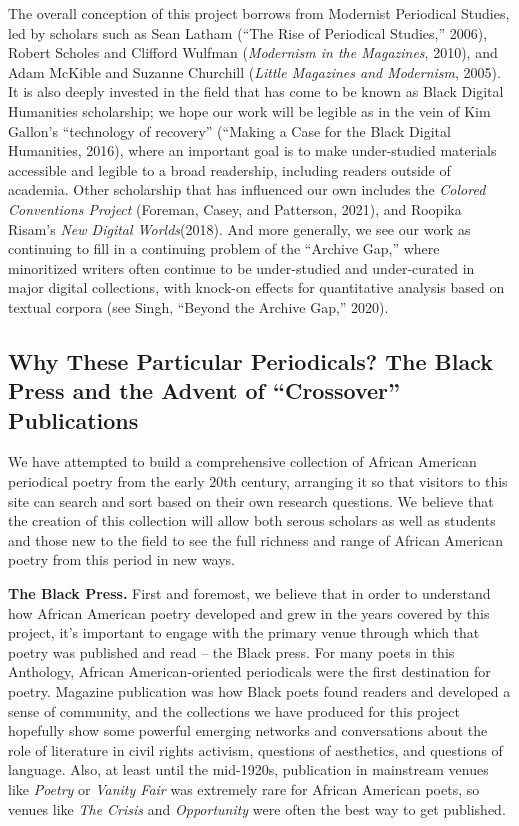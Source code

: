 \documentclass[
  letterpaper,
  DIV=11,
  numbers=noendperiod]{scrartcl}
\begin{document}
The overall conception of this project borrows from Modernist Periodical
Studies, led by scholars such as Sean Latham (``The Rise of Periodical
Studies,'' 2006), Robert Scholes and Clifford Wulfman (\emph{Modernism
in the Magazines}, 2010), and Adam McKible and Suzanne Churchill
(\emph{Little Magazines and Modernism}, 2005). It is also deeply
invested in the field that has come to be known as Black Digital
Humanities scholarship; we hope our work will be legible as in the vein
of Kim Gallon's ``technology of recovery'' (``Making a Case for the
Black Digital Humanities, 2016), where an important goal is to make
under-studied materials accessible and legible to a broad readership,
including readers outside of academia. Other scholarship that has
influenced our own includes the \emph{Colored Conventions Project}
(Foreman, Casey, and Patterson, 2021), and Roopika Risam's \emph{New
Digital Worlds}(2018). And more generally, we see our work as continuing
to fill in a continuing problem of the ``Archive Gap,'' where
minoritized writers often continue to be under-studied and under-curated
in major digital collections, with knock-on effects for quantitative
analysis based on textual corpora (see Singh, ``Beyond the Archive
Gap,'' 2020).

\subsection{Why These Particular Periodicals? The Black Press and the
Advent of ``Crossover''
Publications}\label{why-these-particular-periodicals-the-black-press-and-the-advent-of-crossover-publications}

We have attempted to build a comprehensive collection of African
American periodical poetry from the early 20th century, arranging it so
that visitors to this site can search and sort based on their own
research questions. We believe that the creation of this collection will
allow both serous scholars as well as students and those new to the
field to see the full richness and range of African American poetry from
this period in new ways.

\textbf{The Black Press.} First and foremost, we believe that in order
to understand how African American poetry developed and grew in the
years covered by this project, it's important to engage with the primary
venue through which that poetry was published and read -- the Black
press. For many poets in this Anthology, African American-oriented
periodicals were the first destination for poetry. Magazine publication
was how Black poets found readers and developed a sense of community,
and the collections we have produced for this project hopefully show
some powerful emerging networks and conversations about the role of
literature in civil rights activism, questions of aesthetics, and
questions of language. Also, at least until the mid-1920s, publication
in mainstream venues like \emph{Poetry} or \emph{Vanity Fair} was
extremely rare for African American poets, so venues like \emph{The
Crisis} and \emph{Opportunity} were often the best way to get published.
\end{document}
